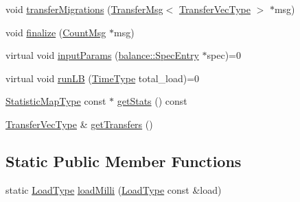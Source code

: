 \begin{DoxyCompactItemize}
\item 
void \hyperlink{structvt_1_1vrt_1_1collection_1_1lb_1_1_base_l_b_adb9e1197bc690340bc1a4a6c77ac5254}{transfer\+Migrations} (\hyperlink{structvt_1_1vrt_1_1collection_1_1lb_1_1_transfer_msg}{Transfer\+Msg}$<$ \hyperlink{structvt_1_1vrt_1_1collection_1_1lb_1_1_base_l_b_a329e8179ec41a1bd4924c79fe23a79af}{Transfer\+Vec\+Type} $>$ $\ast$msg)
\item 
void \hyperlink{structvt_1_1vrt_1_1collection_1_1lb_1_1_base_l_b_a66f2b22d12492c145a3d567ebd67194b}{finalize} (\hyperlink{structvt_1_1vrt_1_1collection_1_1lb_1_1_count_msg}{Count\+Msg} $\ast$msg)
\item 
virtual void \hyperlink{structvt_1_1vrt_1_1collection_1_1lb_1_1_base_l_b_a555e29aadfd428383464d6dd007506b6}{input\+Params} (\hyperlink{structvt_1_1vrt_1_1collection_1_1balance_1_1_spec_entry}{balance\+::\+Spec\+Entry} $\ast$spec)=0
\item 
virtual void \hyperlink{structvt_1_1vrt_1_1collection_1_1lb_1_1_base_l_b_a7caaf2483f046927fd7534a084a8c1b2}{run\+LB} (\hyperlink{namespacevt_a876a9d0cd5a952859c72de8a46881442}{Time\+Type} total\+\_\+load)=0
\item 
\hyperlink{structvt_1_1vrt_1_1collection_1_1lb_1_1_base_l_b_acd9bdad961ac83c96b7a227de672f96c}{Statistic\+Map\+Type} const  $\ast$ \hyperlink{structvt_1_1vrt_1_1collection_1_1lb_1_1_base_l_b_a8e3d3231dc49c55c1c494a5e5957baa1}{get\+Stats} () const
\item 
\hyperlink{structvt_1_1vrt_1_1collection_1_1lb_1_1_base_l_b_a329e8179ec41a1bd4924c79fe23a79af}{Transfer\+Vec\+Type} \& \hyperlink{structvt_1_1vrt_1_1collection_1_1lb_1_1_base_l_b_ace9ba67a70c21b1198feee35827eea11}{get\+Transfers} ()
\end{DoxyCompactItemize}
\subsection*{Static Public Member Functions}
\begin{DoxyCompactItemize}
\item 
static \hyperlink{structvt_1_1vrt_1_1collection_1_1lb_1_1_base_l_b_a215e22b9f12678303f49615ae3be05cc}{Load\+Type} \hyperlink{structvt_1_1vrt_1_1collection_1_1lb_1_1_base_l_b_aadd797eb44f0372e4054e8b3c1ff7ee7}{load\+Milli} (\hyperlink{structvt_1_1vrt_1_1collection_1_1lb_1_1_base_l_b_a215e22b9f12678303f49615ae3be05cc}{Load\+Type} const \&load)
\end{DoxyCompactItemize}
